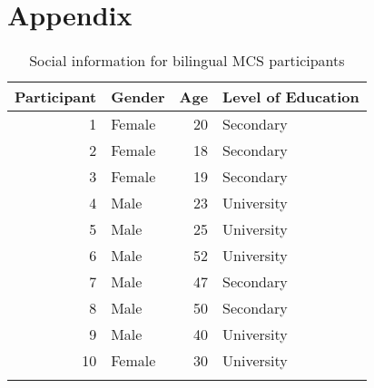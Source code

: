 \documentclass[output=paper,colorlinks,citecolor=brown,
]{langscibook}
\begin{document}
\newpage
\section*{Appendix}
\begin{table}[]
    
    \begin{tabular}{rlrl} 
    \lsptoprule
    \textbf{Participant} & \textbf{Gender} & \textbf{Age} & \textbf{Level of Education}\\ 
    \midrule
     1 & Female & 20 & Secondary\\ 
     2 & Female & 18 &  Secondary\\ 
     3 & Female & 19 & Secondary\\ 
     4 & Male & 23 & University\\ 
     5 & Male & 25 &  University\\ 
     6 & Male & 52 & University\\ 
     7 & Male & 47 & Secondary\\ 
     8 & Male & 50 & Secondary\\ 
     9 & Male & 40 & University\\ 
     10 & Female & 30 & University\\ 
     \lspbottomrule
    \end{tabular}
    \caption{Social information for bilingual MCS participants}
    \label{tab:critchfield:2}
\end{table}

\printbibliography[heading=subbibliography,notkeyword=this]
\end{document}
